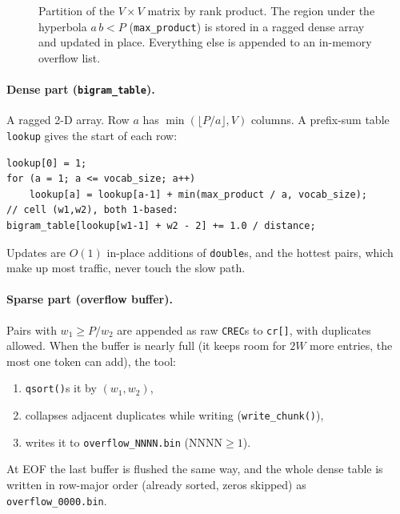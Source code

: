 \documentclass[11pt,a4paper]{article}
\newcommand{\file}[1]{\texttt{#1}}
\newcommand{\fn}[1]{\texttt{#1()}}
\begin{document}
\begin{figure}[h]
\centering
{}
\caption{Partition of the $V\times V$ matrix by rank product. The region under the
hyperbola $a\,b<P$ (\texttt{max\_product}) is stored in a ragged dense array and updated
in place. Everything else is appended to an in-memory overflow list.}
\label{fig:hyperbola}
\end{figure}

\paragraph{Dense part (\texttt{bigram\_table}).} A ragged 2-D array. Row $a$ has
$\min(\lfloor P/a\rfloor, V)$ columns. A prefix-sum table \texttt{lookup} gives the start
of each row:
\begin{lstlisting}
lookup[0] = 1;
for (a = 1; a <= vocab_size; a++)
    lookup[a] = lookup[a-1] + min(max_product / a, vocab_size);
// cell (w1,w2), both 1-based:
bigram_table[lookup[w1-1] + w2 - 2] += 1.0 / distance;
\end{lstlisting}
Updates are $O(1)$ in-place additions of \texttt{double}s, and the hottest pairs, which
make up most traffic, never touch the slow path.

\paragraph{Sparse part (overflow buffer).} Pairs with $w_1 \ge P/w_2$ are appended as raw
\texttt{CREC}s to \texttt{cr[]}, with duplicates allowed. When the buffer is nearly full
(it keeps room for $2W$ more entries, the most one token can add), the tool:
\begin{enumerate}[nosep]
  \item \fn{qsort}s it by $(w_1,w_2)$,
  \item collapses adjacent duplicates while writing (\fn{write\_chunk}),
  \item writes it to \file{overflow\_NNNN.bin} ($\text{NNNN}\ge 1$).
\end{enumerate}
At EOF the last buffer is flushed the same way, and the whole dense table is written in
row-major order (already sorted, zeros skipped) as \file{overflow\_0000.bin}.
\end{document}
